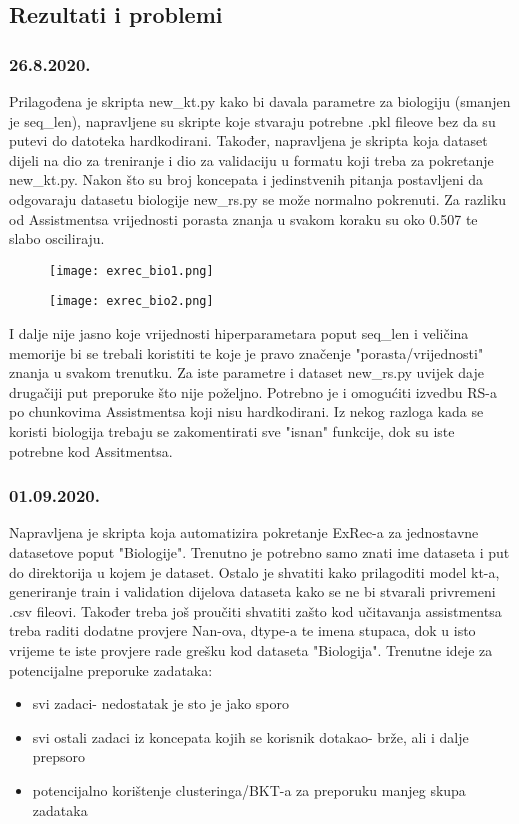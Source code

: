 \subsection{Rezultati i problemi}
 	\subsubsection{26.8.2020.}
 		Prilagođena je skripta new\_kt.py kako bi davala parametre za biologiju (smanjen je seq\_len), napravljene su skripte koje stvaraju potrebne .pkl fileove bez da su putevi do datoteka hardkodirani. Također, napravljena je skripta koja dataset dijeli na dio za treniranje i dio za validaciju u formatu koji treba za pokretanje new\_kt.py. Nakon što su broj koncepata i jedinstvenih pitanja postavljeni da odgovaraju datasetu biologije new\_rs.py se može normalno pokrenuti.
\newline
Za razliku od Assistmentsa vrijednosti porasta znanja u svakom koraku su oko 0.507 te slabo osciliraju.
 		\begin{figure}[!htb]
 			\centering
 			\texttt{[image: exrec\_bio1.png]}
 			\caption{}
 			\label{}
 		\end{figure}
 	
 	\begin{figure}[!htb]
 		\centering
 		\texttt{[image: exrec\_bio2.png]}
 		\caption{}
 		\label{}
 	\end{figure}
 
 	I dalje nije jasno koje vrijednosti hiperparametara poput seq\_len i veličina memorije bi se trebali koristiti te koje je pravo značenje "porasta/vrijednosti" znanja u svakom trenutku. Za iste parametre i dataset new\_rs.py uvijek daje drugačiji put preporuke što nije poželjno. Potrebno je i omogućiti izvedbu RS-a po chunkovima Assistmentsa koji nisu hardkodirani. Iz nekog razloga kada se koristi biologija trebaju se zakomentirati sve "isnan" funkcije, dok su iste potrebne kod Assitmentsa.
	
	\subsubsection{01.09.2020.}
		Napravljena je skripta koja automatizira pokretanje ExRec-a za jednostavne datasetove poput "Biologije". Trenutno je potrebno samo znati ime dataseta i put do direktorija u kojem je dataset. Ostalo je shvatiti kako prilagoditi model kt-a, generiranje train i validation dijelova dataseta kako se ne bi stvarali privremeni .csv fileovi. Također treba još proučiti shvatiti zašto kod učitavanja assistmentsa treba raditi dodatne provjere Nan-ova, dtype-a te imena stupaca, dok u isto vrijeme te iste provjere rade grešku kod dataseta "Biologija".
		Trenutne ideje za potencijalne preporuke zadataka:
		\begin{itemize}
			\item svi zadaci- nedostatak je sto je jako sporo
			\item svi ostali zadaci iz koncepata kojih se korisnik dotakao- brže, ali i dalje prepsoro
			\item potencijalno korištenje clusteringa/BKT-a za preporuku manjeg skupa zadataka
		\end{itemize}

